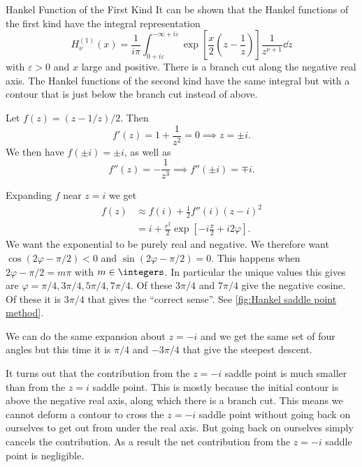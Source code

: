\documentclass[fleqn]{NotesClass}
\begin{document}
    \begin{exm}{Hankel Function of the First Kind}{}
        It can be shown that the Hankel functions of the first kind have the integral representation
        \begin{equation}\label{eqn:hankel function first time integral}
            H_\nu^{(1)}(x) = \frac{1}{i\pi} \int_{0 + i\varepsilon}^{-\infty + i\varepsilon} \exp\left[ \frac{x}{2}\left( z - \frac{1}{z} \right) \right] \frac{1}{z^{\nu + 1}}\dd{z}
        \end{equation}
        with \(\varepsilon > 0\) and \(x\) large and positive.
        There is a branch cut along the negative real axis.
        The Hankel functions of the second kind have the same integral but with a contour that is just below the branch cut instead of above.
        
        Let \(f(z) = (z - 1/z)/2\).
        Then
        \begin{equation}
            f'(z) = 1 + \frac{1}{z^2} = 0 \implies z = \pm i.
        \end{equation}
        We then have \(f(\pm i) = \pm i\), as well as
        \begin{equation}
            f''(z) = -\frac{1}{z^3} \implies f''(\pm i) = \mp i.
        \end{equation}
        
        Expanding \(f\) near \(z = i\) we get
        \begin{align}
            f(z) &\approx f(i) + \frac{1}{2}f''(i)(z - i)^2\\
            &= i + \frac{r^2}{2}\exp\left[ -i\frac{\pi}{2} + i2\varphi \right].
        \end{align}
        We want the exponential to be purely real and negative.
        We therefore want \(\cos(2\varphi - \pi/2)  < 0\) and \(\sin(2\varphi - \pi/2) = 0\).
        This happens when \(2\varphi - \pi/2 = m\pi\) with \(m\in\integers\).
        In particular the unique values this gives are \(\varphi = \pi/4, 3\pi/4, 5\pi/4, 7\pi/4\).
        Of these \(3\pi/4\) and \(7\pi/4\) give the negative cosine.
        Of these it is \(3\pi/4\) that gives the \enquote{correct sense}.
        See \cref{fig:Hankel saddle point method}.
        
        We can do the same expansion about \(z = -i\) and we get the same set of four angles but this time it is \(\pi/4\) and \(-3\pi/4\) that give the steepest descent.
        
        It turns out that the contribution from the \(z = -i\) saddle point is much smaller than from the \(z = i\) saddle point.
        This is mostly because the initial contour is above the negative real axis, along which there is a branch cut.
        This means we cannot deform a contour to cross the \(z = -i\) saddle point without going back on ourselves to get out from under the real axis.
        But going back on ourselves simply cancels the contribution.
        As a result the net contribution from the \(z = -i\) saddle point is negligible.
        

\end{exm}
\end{document}
